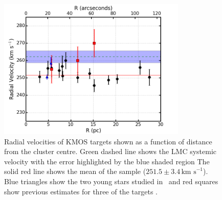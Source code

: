 \documentclass[useAMS,usenatbib]{mn2e}
\def\kms{$\mbox{km s}^{-1}$}
\begin{document}
\begin{figure}
 \includegraphics[width=9.0cm]{NGC2100-rv-v8}
 \caption{Radial velocities of KMOS targets shown as a function of distance from the cluster centre.
 Green dashed line shows the LMC systemic velocity with the error highlighted by the blue shaded region
 {\citep[$262.2\pm3.4$\,\kms;][]{2012AJ....144....4M}}
 The solid red line shows the mean of the sample ($251.5\pm3.4\,$\kms).
 Blue triangles show the two young stars studied in~\protect\cite{2015arXiv150803490E} and red squares show previous estimates for three of the targets
 {\citep{1994A&A...282..717J}}.\label{fig:rvs}}
\end{figure}
\end{document}
